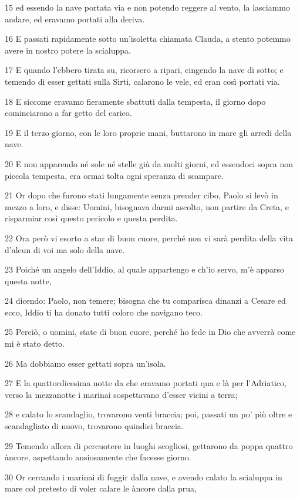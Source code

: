 \par 15 ed essendo la nave portata via e non potendo reggere al vento, la lasciammo andare, ed eravamo portati alla deriva.
\par 16 E passati rapidamente sotto un'isoletta chiamata Clauda, a stento potemmo avere in nostro potere la scialuppa.
\par 17 E quando l'ebbero tirata su, ricorsero a ripari, cingendo la nave di sotto; e temendo di esser gettati sulla Sirti, calarono le vele, ed eran così portati via.
\par 18 E siccome eravamo fieramente sbattuti dalla tempesta, il giorno dopo cominciarono a far getto del carico.
\par 19 E il terzo giorno, con le loro proprie mani, buttarono in mare gli arredi della nave.
\par 20 E non apparendo né sole né stelle già da molti giorni, ed essendoci sopra non piccola tempesta, era ormai tolta ogni speranza di scampare.
\par 21 Or dopo che furono stati lungamente senza prender cibo, Paolo si levò in mezzo a loro, e disse: Uomini, bisognava darmi ascolto, non partire da Creta, e risparmiar così questo pericolo e questa perdita.
\par 22 Ora però vi esorto a star di buon cuore, perché non vi sarà perdita della vita d'alcun di voi ma solo della nave.
\par 23 Poiché un angelo dell'Iddio, al quale appartengo e ch'io servo, m'è apparso questa notte,
\par 24 dicendo: Paolo, non temere; bisogna che tu comparisca dinanzi a Cesare ed ecco, Iddio ti ha donato tutti coloro che navigano teco.
\par 25 Perciò, o uomini, state di buon cuore, perché ho fede in Dio che avverrà come mi è stato detto.
\par 26 Ma dobbiamo esser gettati sopra un'isola.
\par 27 E la quattordicesima notte da che eravamo portati qua e là per l'Adriatico, verso la mezzanotte i marinai sospettavano d'esser vicini a terra;
\par 28 e calato lo scandaglio, trovarono venti braccia; poi, passati un po' più oltre e scandagliato di nuovo, trovarono quindici braccia.
\par 29 Temendo allora di percuotere in luoghi scogliosi, gettarono da poppa quattro àncore, aspettando ansiosamente che facesse giorno.
\par 30 Or cercando i marinai di fuggir dalla nave, e avendo calato la scialuppa in mare col pretesto di voler calare le àncore dalla prua,
